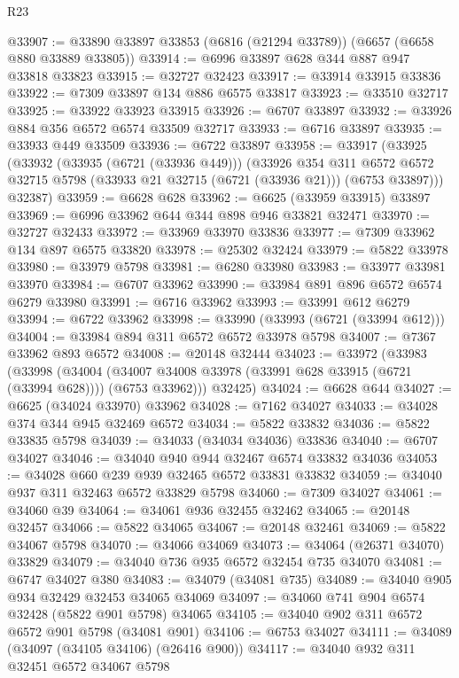 \begin{lexlean}{R23}
\begin{coremodule}
@33907 := @33890 @33897 @33853 (@6816 (@21294 @33789)) (@6657 (@6658 @880 @33889 @33805))
@33914 := @6996 @33897 @628 @344 @887 @947 @33818 @33823
@33915 := @32727 @32423
@33917 := @33914 @33915 @33836
@33922 := @7309 @33897 @134 @886 @6575 @33817
@33923 := @33510 @32717
@33925 := @33922 @33923 @33915
@33926 := @6707 @33897
@33932 := @33926 @884 @356 @6572 @6574 @33509 @32717
@33933 := @6716 @33897
@33935 := @33933 @449 @33509
@33936 := @6722 @33897
@33958 := @33917
    (@33925
      (@33932
        (@33935 (@6721 (@33936 @449)))
        (@33926
          @354
          @311
          @6572
          @6572
          @32715
          @5798
          (@33933 @21 @32715 (@6721 (@33936 @21)))
          (@6753 @33897)))
      @32387)
@33959 := @6628 @628
@33962 := @6625 (@33959 @33915) @33897
@33969 := @6996 @33962 @644 @344 @898 @946 @33821 @32471
@33970 := @32727 @32433
@33972 := @33969 @33970 @33836
@33977 := @7309 @33962 @134 @897 @6575 @33820
@33978 := @25302 @32424
@33979 := @5822 @33978
@33980 := @33979 @5798
@33981 := @6280 @33980
@33983 := @33977 @33981 @33970
@33984 := @6707 @33962
@33990 := @33984 @891 @896 @6572 @6574 @6279 @33980
@33991 := @6716 @33962
@33993 := @33991 @612 @6279
@33994 := @6722 @33962
@33998 := @33990 (@33993 (@6721 (@33994 @612)))
@34004 := @33984 @894 @311 @6572 @6572 @33978 @5798
@34007 := @7367 @33962 @893 @6572
@34008 := @20148 @32444
@34023 := @33972
    (@33983
      (@33998
        (@34004 (@34007 @34008 @33978 (@33991 @628 @33915 (@6721 (@33994 @628)))) (@6753 @33962)))
      @32425)
@34024 := @6628 @644
@34027 := @6625 (@34024 @33970) @33962
@34028 := @7162 @34027
@34033 := @34028 @374 @344 @945 @32469 @6572
@34034 := @5822 @33832
@34036 := @5822 @33835 @5798
@34039 := @34033 (@34034 @34036) @33836
@34040 := @6707 @34027
@34046 := @34040 @940 @944 @32467 @6574 @33832 @34036
@34053 := @34028 @660 @239 @939 @32465 @6572 @33831 @33832
@34059 := @34040 @937 @311 @32463 @6572 @33829 @5798
@34060 := @7309 @34027
@34061 := @34060 @39
@34064 := @34061 @936 @32455 @32462
@34065 := @20148 @32457
@34066 := @5822 @34065
@34067 := @20148 @32461
@34069 := @5822 @34067 @5798
@34070 := @34066 @34069
@34073 := @34064 (@26371 @34070) @33829
@34079 := @34040 @736 @935 @6572 @32454 @735 @34070
@34081 := @6747 @34027 @380
@34083 := @34079 (@34081 @735)
@34089 := @34040 @905 @934 @32429 @32453 @34065 @34069
@34097 := @34060 @741 @904 @6574 @32428 (@5822 @901 @5798) @34065
@34105 := @34040 @902 @311 @6572 @6572 @901 @5798 (@34081 @901)
@34106 := @6753 @34027
@34111 := @34089 (@34097 (@34105 @34106) (@26416 @900))
@34117 := @34040 @932 @311 @32451 @6572 @34067 @5798

\end{coremodule}
\end{lexlean}

